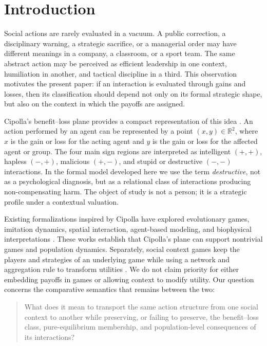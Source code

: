 \documentclass[a4paper,fleqn]{cas-dc}
\theoremstyle{remark}
\newcommand{\R}{\mathbb{R}}
\begin{document}
\maketitle

\section{Introduction}

Social actions are rarely evaluated in a vacuum. A public correction, a disciplinary warning, a strategic sacrifice, or a managerial order may have different meanings in a company, a classroom, or a sport team. The same abstract action may be perceived as efficient leadership in one context, humiliation in another, and tactical discipline in a third. This observation motivates the present paper: if an interaction is evaluated through gains and losses, then its classification should depend not only on its formal strategic shape, but also on the context in which the payoffs are assigned.

Cipolla's benefit--loss plane provides a compact representation of this idea \citep{Cipolla2011}. An action performed by an agent can be represented by a point $(x,y)\in\R^2$, where $x$ is the gain or loss for the acting agent and $y$ is the gain or loss for the affected agent or group. The four main sign regions are interpreted as intelligent $(+,+)$, hapless $(-,+)$, malicious $(+,-)$, and stupid or destructive $(-,-)$ interactions. In the formal model developed here we use the term \emph{destructive}, not as a psychological diagnosis, but as a relational class of interactions producing non-compensating harm. The object of study is not a person; it is a strategic profile under a contextual valuation.

Existing formalizations inspired by Cipolla have explored evolutionary games, imitation dynamics, spatial interaction, agent-based modeling, and biophysical interpretations \citep{Kuperman2020, Barcenas2020, Tettamanzi2014, PerissiBardi2021}. These works establish that Cipolla's plane can support nontrivial games and population dynamics. Separately, social context games keep the players and strategies of an underlying game while using a network and aggregation rule to transform utilities \citep{AshlagiKrystaTennenholtz2008}. We do not claim priority for either embedding payoffs in games or allowing context to modify utility. Our question concerns the comparative semantics that remains between the two:
\begin{quote}
What does it mean to transport the same action structure from one social context to another while preserving, or failing to preserve, the benefit--loss class, pure-equilibrium membership, and population-level consequences of its interactions?
\end{quote}
\end{document}
